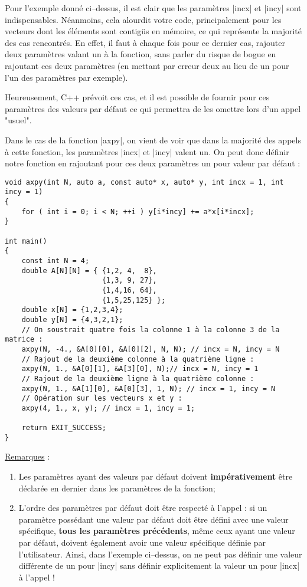 \begin{itemize}
Pour l'exemple donné ci--dessus, il est clair que les paramètres |incx| et |incy| sont indispensables. 
Néanmoins, cela alourdit votre code, principalement pour les vecteurs dont les éléments sont contigüs en mémoire, ce qui représente la majorité des cas rencontrés. En effet, 
il faut à chaque fois pour ce dernier cas, rajouter deux paramètres valant un à la fonction, sans parler du risque de bogue en rajoutant ces deux paramètres (en mettant par erreur deux au lieu de un pour l'un des paramètres par exemple).

Heureusement, C++ prévoit ces cas, et il est possible de fournir pour ces paramètres des valeurs par défaut ce qui permettra de les omettre lors d'un appel "usuel".

Dans le cas de la fonction |axpy|, on vient de voir que dans la majorité des appels à cette fonction, les paramètres |incx| et |incy| valent un. On peut donc définir notre fonction en rajoutant pour ces deux paramètres un pour valeur par défaut :
\begin{lstlisting}[caption=Valeurs par défaut pour la fonction axpy]
void axpy(int N, auto a, const auto* x, auto* y, int incx = 1, int incy = 1)
{
    for ( int i = 0; i < N; ++i ) y[i*incy] += a*x[i*incx];
}

int main()
{
    const int N = 4;
    double A[N][N] = { {1,2, 4,  8}, 
                       {1,3, 9, 27},
                       {1,4,16, 64},
                       {1,5,25,125} };
    double x[N] = {1,2,3,4};
    double y[N] = {4,3,2,1};
    // On soustrait quatre fois la colonne 1 à la colonne 3 de la matrice :
    axpy(N, -4., &A[0][0], &A[0][2], N, N); // incx = N, incy = N
    // Rajout de la deuxième colonne à la quatrième ligne :
    axpy(N, 1., &A[0][1], &A[3][0], N);// incx = N, incy = 1
    // Rajout de la deuxième ligne à la quatrième colonne :
    axpy(N, 1., &A[1][0], &A[0][3], 1, N); // incx = 1, incy = N
    // Opération sur les vecteurs x et y :
    axpy(4, 1., x, y); // incx = 1, incy = 1;

    return EXIT_SUCCESS;
}
\end{lstlisting}

\underline{Remarques} :
\begin{enumerate}
    \item Les paramètres ayant des valeurs par défaut doivent \textbf{impérativement} être déclarée en dernier dans les paramètres de la fonction;
    \item L'ordre des paramètres par défaut doit être respecté à l'appel : si un paramètre possédant une valeur par défaut doit être défini avec une valeur spécifique, \textbf{tous les paramètres précédents}, même ceux ayant une valeur par défaut, doivent également avoir une valeur spécifique définie par l'utilisateur. Ainsi, dans l'exemple ci--dessus, on ne peut pas définir une valeur différente de un pour |incy| sans définir explicitement la valeur un pour |incx| à l'appel !
\end{enumerate}



\end{itemize}
